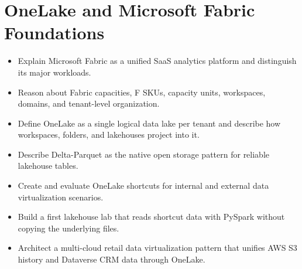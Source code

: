 \chapter{OneLake and Microsoft Fabric Foundations}
%
%

\begin{objectives}
\begin{itemize}
    \item Explain Microsoft Fabric as a unified SaaS analytics platform and distinguish its major workloads.
    \item Reason about Fabric capacities, F SKUs, capacity units, workspaces, domains, and tenant-level organization.
    \item Define OneLake as a single logical data lake per tenant and describe how workspaces, folders, and lakehouses project into it.
    \item Describe Delta-Parquet as the native open storage pattern for reliable lakehouse tables.
    \item Create and evaluate OneLake shortcuts for internal and external data virtualization scenarios.
    \item Build a first lakehouse lab that reads shortcut data with PySpark without copying the underlying files.
    \item Architect a multi-cloud retail data virtualization pattern that unifies AWS S3 history and Dataverse CRM data through OneLake.
\end{itemize}
\end{objectives}

